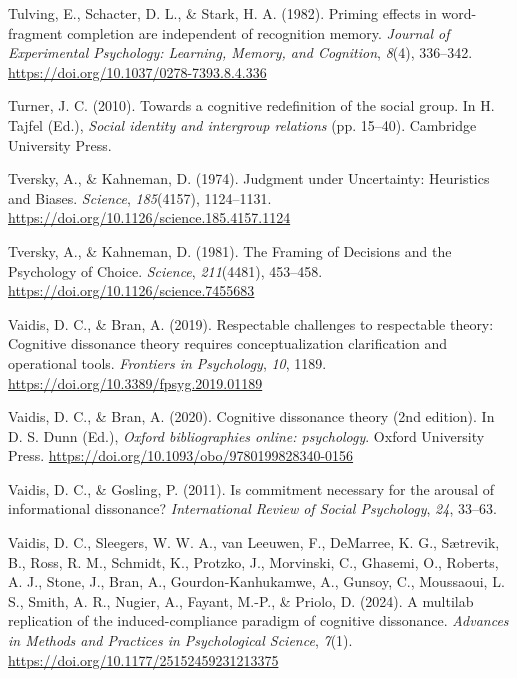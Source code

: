 \documentclass[
  letterpaper,
]{book}
\newlength{\cslhangindent}
\newenvironment{CSLReferences}[2] %
 {\begin{list}{}{%
  \setlength{\itemindent}{0pt}
  \setlength{\leftmargin}{0pt}
  \setlength{\parsep}{0pt}
  \ifodd #1
   \setlength{\leftmargin}{\cslhangindent}
   \setlength{\itemindent}{-1\cslhangindent}
  \fi
  \setlength{\itemsep}{#2\baselineskip}}}
 {\end{list}}
\begin{document}
\begin{CSLReferences}{1}{0}
Tulving, E., Schacter, D. L., \& Stark, H. A. (1982). Priming effects in
word-fragment completion are independent of recognition memory.
\emph{Journal of Experimental Psychology: Learning, Memory, and
Cognition}, \emph{8}(4), 336--342.
\url{https://doi.org/10.1037/0278-7393.8.4.336}

Turner, J. C. (2010). Towards a cognitive redefinition of the social
group. In H. Tajfel (Ed.), \emph{Social identity and intergroup
relations} (pp. 15--40). Cambridge University Press.

Tversky, A., \& Kahneman, D. (1974). Judgment under {Uncertainty}:
{Heuristics} and {Biases}. \emph{Science}, \emph{185}(4157), 1124--1131.
\url{https://doi.org/10.1126/science.185.4157.1124}

Tversky, A., \& Kahneman, D. (1981). The {Framing} of {Decisions} and
the {Psychology} of {Choice}. \emph{Science}, \emph{211}(4481),
453--458. \url{https://doi.org/10.1126/science.7455683}

Vaidis, D. C., \& Bran, A. (2019). Respectable challenges to respectable
theory: Cognitive dissonance theory requires conceptualization
clarification and operational tools. \emph{Frontiers in Psychology},
\emph{10}, 1189. \url{https://doi.org/10.3389/fpsyg.2019.01189}

Vaidis, D. C., \& Bran, A. (2020). Cognitive dissonance theory (2nd
edition). In D. S. Dunn (Ed.), \emph{Oxford bibliographies online:
psychology}. Oxford University Press.
\url{https://doi.org/10.1093/obo/9780199828340-0156}

Vaidis, D. C., \& Gosling, P. (2011). Is commitment necessary for the
arousal of informational dissonance? \emph{International Review of
Social Psychology}, \emph{24}, 33--63.

Vaidis, D. C., Sleegers, W. W. A., van Leeuwen, F., DeMarree, K. G.,
Sætrevik, B., Ross, R. M., Schmidt, K., Protzko, J., Morvinski, C.,
Ghasemi, O., Roberts, A. J., Stone, J., Bran, A., Gourdon-Kanhukamwe,
A., Gunsoy, C., Moussaoui, L. S., Smith, A. R., Nugier, A., Fayant,
M.-P., \& Priolo, D. (2024). A multilab replication of the
induced-compliance paradigm of cognitive dissonance. \emph{Advances in
Methods and Practices in Psychological Science}, \emph{7}(1).
\url{https://doi.org/10.1177/25152459231213375}


\end{CSLReferences}
\end{document}

